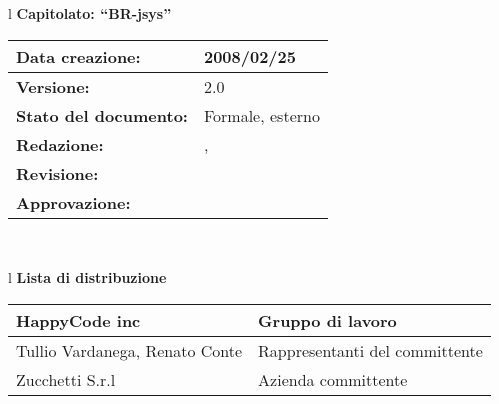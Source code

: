 


\newcommand{\lv}{ 2.0 } %
\newcommand{\dt}{ Manuale Utente }%
\newcommand{\Grammatica}{} %

\begin{center}
\thispagestyle{plain}
\begin{table}[htbp]
\large{
\begin{tabular}{l}
\Large{\textbf{\textsf{Capitolato: ``BR-jsys''}}} \\
\begin{tabular}{|p{6cm}|p{6cm}|} \hline
\textbf{Data creazione:} & 2008/02/25 \\ \hline
\textbf{Versione:} & \lv \\ \hline
\textbf{Stato del documento:} & Formale, esterno \\ \hline
\textbf{Redazione:} &  \AT, \LA \\ \hline
\textbf{Revisione:} & \FC \\ \hline
\textbf{Approvazione:} & \MM \\ \hline
\end{tabular} \\
\end{tabular}
}
\end{table}

\begin{table}[hbtp]
\large{
\begin{tabular}{l}
\Large{\textbf{\textsf{Lista di distribuzione}}} \\

\begin{tabular}{|p{6cm}|p{6cm}|} \hline
{HappyCode inc}& Gruppo di lavoro\\ \hline
{Tullio Vardanega, Renato Conte}& Rappresentanti del committente \\ \hline
{Zucchetti S.r.l}& Azienda committente\\ \hline
\end{tabular} \\
\end{tabular}
}
\end{table}
\begin{table}[hbtp]


\end{table}
\end{center}
